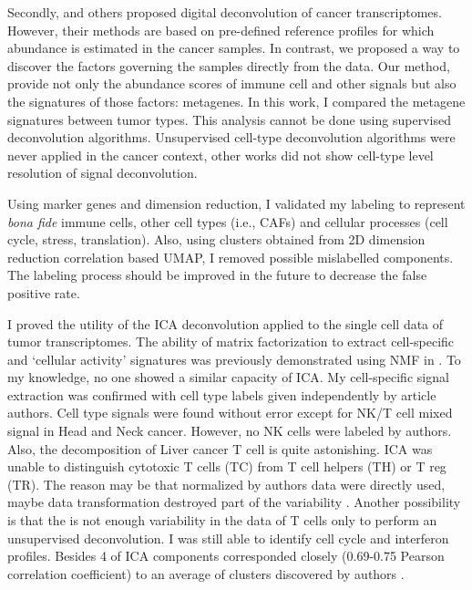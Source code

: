 \documentclass[12pt,]{book}
\theoremstyle{definition}
\theoremstyle{definition}
\theoremstyle{definition}
\theoremstyle{remark}
\begin{document}
Secondly, \citep{Newman2015, Racle2017, Aran2017, Becht2016} and others
proposed digital deconvolution of cancer transcriptomes. However, their
methods are based on pre-defined reference profiles for which abundance
is estimated in the cancer samples. In contrast, we proposed a way to
discover the factors governing the samples directly from the data. Our
method, provide not only the abundance scores of immune cell and other
signals but also the signatures of those factors: metagenes. In this
work, I compared the metagene signatures between tumor types. This
analysis cannot be done using supervised deconvolution algorithms.
Unsupervised cell-type deconvolution algorithms
\citep{Newberg2018, Ogundijo2017, Wang2016, Repsilber2010} were never
applied in the cancer context, other works
\citep{Moffitt2015, Brunet2004, Biton2014} did not show cell-type level
resolution of signal deconvolution.

Using marker genes and dimension reduction, I validated my labeling to
represent \emph{bona fide} immune cells, other cell types (i.e., CAFs)
and cellular processes (cell cycle, stress, translation). Also, using
clusters obtained from 2D dimension reduction correlation based UMAP, I
removed possible mislabelled components. The labeling process should be
improved in the future to decrease the false positive rate.

I proved the utility of the ICA deconvolution applied to the single cell
data of tumor transcriptomes. The ability of matrix factorization to
extract cell-specific and `cellular activity' signatures was previously
demonstrated using NMF in \citep{Kotliar2018}. To my knowledge, no one
showed a similar capacity of ICA. My cell-specific signal extraction was
confirmed with cell type labels given independently by article authors.
Cell type signals were found without error except for NK/T cell mixed
signal in Head and Neck cancer. However, no NK cells were labeled by
authors. Also, the decomposition of Liver cancer T cell is quite
astonishing. ICA was unable to distinguish cytotoxic T cells (TC) from T
cell helpers (TH) or T reg (TR). The reason may be that normalized by
authors data were directly used, maybe data transformation destroyed
part of the variability \citep{Paulson2017}. Another possibility is that
the is not enough variability in the data of T cells only to perform an
unsupervised deconvolution. I was still able to identify cell cycle and
interferon profiles. Besides 4 of ICA components corresponded closely
(0.69-0.75 Pearson correlation coefficient) to an average of clusters
discovered by authors \citep{Zheng2017}.
\end{document}

